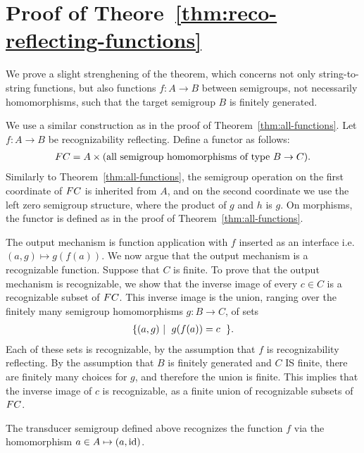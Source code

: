 \section{Proof of Theore~\ref{thm:reco-reflecting-functions}}
    We prove a slight strenghening of the theorem, which concerns not only string-to-string functions, but also functions $f : A \to B$ between semigroups, not necessarily homomorphisms, such that the target semigroup $B$ is finitely generated.

      We  use a similar construction as in the proof of Theorem~\ref{thm:all-functions}. Let  $f :A \to B$  be recognizability reflecting.  Define  a functor as follows: 
    \begin{align*}
        \functor C = A \times \text{(all semigroup homomorphisms of type $B \to C$)}.
    \end{align*}
    Similarly to Theorem~\ref{thm:all-functions}, the semigroup operation on the first coordinate of $\functor C$ is inherited from $A$, and on the second coordinate we use the left zero semigroup structure,  where the product of $g$ and $h$ is $g$.     On morphisms, the functor is defined as in the proof of Theorem~\ref{thm:all-functions}. 

    The output mechanism  is function application with $f$ inserted as an interface i.e.~$(a,g) \mapsto g(f(a))$. We now argue that the output mechanism is a recognizable function. Suppose that $C$ is finite. 
     To prove that the output mechanism is recognizable, we show that the inverse image of every $c \in C$ is a  recognizable subset of $\functor C$. This inverse image is the union, ranging over the finitely many semigroup homomorphisms $g : B \to C$, of sets
    \begin{align*}
    \setbuild {(a,g)}{$g(f(a))=c$}.
    \end{align*}
    Each of these sets is recognizable, by the assumption that $f$ is recognizability reflecting.     By the assumption that $B$ is finitely generated and $C$ IS finite, there are finitely many choices for $g$, and therefore the union is finite. This implies that the inverse image of $c$ is recognizable, as a finite union of recognizable subsets of  $\functor C$.
    
    The transducer semigroup defined above recognizes the function $f$ via the homomorphism $a \in A  \mapsto  (a,\mathrm{id})$.
    

